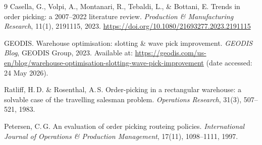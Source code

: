 \documentclass[12pt,a4paper]{article}
\begin{document}
\begin{thebibliography}{9}
Casella, G., Volpi, A., Montanari, R., Tebaldi, L., \& Bottani, E.
Trends in order picking: a 2007--2022 literature review.
\textit{Production \& Manufacturing Research}, 11(1), 2191115, 2023.
\url{https://doi.org/10.1080/21693277.2023.2191115}

GEODIS. Warehouse optimisation: slotting \& wave pick improvement.
\textit{GEODIS Blog}, GEODIS Group, 2023.
Available at: \url{https://geodis.com/us-en/blog/warehouse-optimisation-slotting-wave-pick-improvement}
(date accessed: 24 May 2026).

Ratliff, H.\,D. \& Rosenthal, A.\,S.
Order-picking in a rectangular warehouse: a solvable case of the travelling salesman
problem.
\textit{Operations Research}, 31(3), 507--521, 1983.

Petersen, C.\,G.
An evaluation of order picking routeing policies.
\textit{International Journal of Operations \& Production Management}, 17(11),
1098--1111, 1997.

\end{thebibliography}
\end{document}
